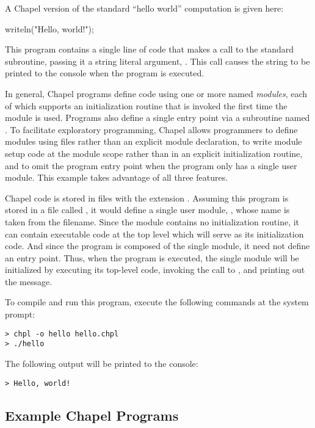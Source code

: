 A Chapel version of the standard ``hello world'' computation is given
here:
\begin{chapel}
writeln("Hello, world!");
\end{chapel}
\noindent This program contains a single line of code that makes a
call to the standard  subroutine, passing it a string
literal argument, .  This call causes the string
to be printed to the console when the program is executed.

In general, Chapel programs define code using one or more named
\emph{modules}, each of which supports an initialization routine that
is invoked the first time the module is used.  Programs also define a
single entry point via a subroutine named .  To facilitate
exploratory programming, Chapel allows programmers to define modules
using files rather than an explicit module declaration, to write
module setup code at the module scope rather than in an explicit
initialization routine, and to omit the program entry point when the
program only has a single user module.  This example takes advantage
of all three features.

Chapel code is stored in files with the extension .
Assuming this program is stored in a file called , it
would define a single user module, , whose name is taken
from the filename.  Since the module contains no initialization
routine, it can contain executable code at the top level which will
serve as its initialization code.  And since the program is composed
of the single  module, it need not define an entry point.
Thus, when the program is executed, the single  module
will be initialized by executing its top-level code, invoking the call
to , and printing out the message.

To compile and run this program, execute the following commands at the
system prompt:
{\small
\begin{verbatim} 
> chpl -o hello hello.chpl
> ./hello
\end{verbatim}}
The following output will be printed to the console:
{\small
\begin{verbatim}
> Hello, world!
\end{verbatim}}

\subsection{Example Chapel Programs}

